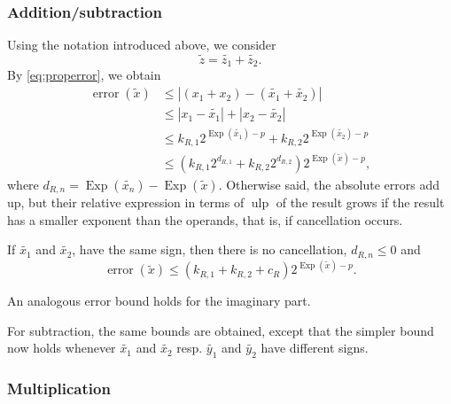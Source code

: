 \documentclass [12pt]{article}
\newcommand {\corr}[1]{{#1}}
\newcommand {\appro}[1]{\widetilde {#1}}
\newcommand {\Ulp}{{\operatorname {ulp}}}
\DeclareMathOperator{\Exp}{\operatorname {Exp}}
\newcommand{\error}{\operatorname {error}}
\renewcommand {\leq}{\leqslant}
\begin{document}
\subsubsection {Addition/subtraction}

Using the notation introduced above, we consider
\[
\appro z = \appro {z_1} + \appro {z_2}.
\]
By \eqref {eq:properror}, we obtain
\begin{align*}
\error (\appro x)
& \leq | (\corr {x_1} + \corr {x_2}) - (\appro {x_1} + \appro {x_2})|
\\
& \leq | \corr {x_1} - \appro {x_1} | + | \corr {x_2} - \appro {x_2}|
\\
& \leq k_{R,1} 2^{\Exp (\appro {x_1}) - p}
+ k_{R,2} 2^{\Exp (\appro {x_2}) - p}
\\
& \leq \left( k_{R,1} 2^{d_{R,1}} + k_{R,2} 2^{d_{R,2}} \right)
2^{\Exp (\appro x) - p},
\end{align*}
where $d_{R,n}=\Exp(\appro {x_n})-\Exp(\appro x)$.
Otherwise said, the absolute errors add up, but their relative expression
in terms of $\Ulp$ of the result grows if the result has a smaller
exponent than the operands, that is, if cancellation occurs.

If $\appro {x_1}$ and $\appro {x_2}$, have the same sign, then there
is no cancellation, $d_{R, n} \leq 0$ and
\[
\error (\appro x) \leq (k_{R,1} + k_{R,2} + c_R) 2^{\Exp (\appro x) - p}.
\]

An analogous error bound holds for the imaginary part.

For subtraction, the same bounds are obtained, except that the simpler bound
now holds whenever $\appro {x_1}$ and $\appro {x_2}$ resp.
$\appro {y_1}$ and $\appro {y_2}$ have different signs.


\subsubsection {Multiplication}
\label {sssec:propmul}
\end{document}

